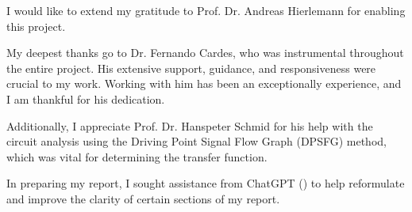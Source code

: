 \documentclass[
11pt, %
oneside, %
english, %
singlespacing, %
parskip, %
headsepline, %
consistentlayout, %
]{MastersDoctoralThesis} %
\begin{document}
\begin{acknowledgements}
\addchaptertocentry{\acknowledgementname} %
I would like to extend my gratitude to Prof. Dr. Andreas Hierlemann for enabling this project.

My deepest thanks go to Dr. Fernando Cardes, who was instrumental throughout the entire project. His extensive support, guidance, and responsiveness were crucial to my work. Working with him has been an exceptionally experience, and I am thankful for his dedication.

Additionally, I appreciate Prof. Dr. Hanspeter Schmid for his help with the circuit analysis using the Driving Point Signal Flow Graph (DPSFG) method, which was vital for determining the transfer function.

In preparing my report, I sought assistance from ChatGPT (\textcite{chatgpt}) to help reformulate and improve the clarity of certain sections of my report.
\end{acknowledgements}


\setcounter{tocdepth}{1}
\tableofcontents %

\listoffigures %

\listoftables %

\end{document}
